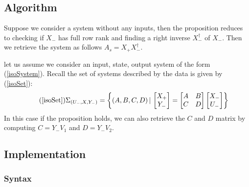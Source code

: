 \subsection{Algorithm}

Suppose we consider a system without any inputs, then the proposition reduces to checking if $X_-$ has full row rank and finding a right inverse $X_-^\dagger$ of $X_-$. Then we retrieve the system as follows $A_s = X_+ X_-^\dagger$.

let us assume we consider an input, state, output system of the form (\ref{isoSystem}). Recall the set of systems described by the data is given by (\ref{isoSet}):
\begin{equation*} \tag{\ref{isoSet}}
\Sigma_{(U_-,X, Y_-)} = \left\{ (A, B, C, D) \, | \, 
\begin{bmatrix} X_{+} \\ Y_{-} \end{bmatrix} = 
\begin{bmatrix} A & B \\ C & D \end{bmatrix} 
\begin{bmatrix} X_{-} \\ U_{-} \end{bmatrix} \right\} 
\end{equation*}
In this case if the proposition holds, we can also retrieve the $C$ and $D$ matrix by computing $C = Y_- V_1$ and $D = Y_- V_2$.

\subsection{Implementation}
\subsubsection*{Syntax}
 \\
 \\

